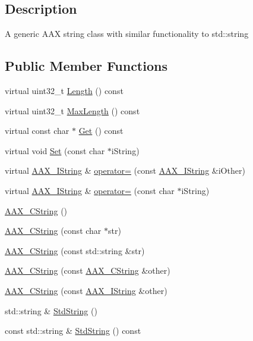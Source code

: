 \subsection{Description}
A generic A\+A\+X string class with similar functionality to {\ttfamily std\+::string} \subsection*{Public Member Functions}
\begin{DoxyCompactItemize}
\item 
virtual uint32\+\_\+t \hyperlink{a00042_a72ac5c3649eda73815efb6deb139cee4}{Length} () const 
\item 
virtual uint32\+\_\+t \hyperlink{a00042_a2d4bc02baad1787f74d8a59d9c68d3a0}{Max\+Length} () const 
\item 
virtual const char $\ast$ \hyperlink{a00042_aa2fd3c16a7bc036d26b66159caa576f3}{Get} () const 
\item 
virtual void \hyperlink{a00042_a0cdc8c41b8badaa9bcde411db95ac84d}{Set} (const char $\ast$i\+String)
\item 
virtual \hyperlink{a00113}{A\+A\+X\+\_\+\+I\+String} \& \hyperlink{a00042_a16f7f37d975e9c6fe7a5d1ef97eb5247}{operator=} (const \hyperlink{a00113}{A\+A\+X\+\_\+\+I\+String} \&i\+Other)
\item 
virtual \hyperlink{a00113}{A\+A\+X\+\_\+\+I\+String} \& \hyperlink{a00042_a2beb6db60d5a5f1109ef84105da7b63d}{operator=} (const char $\ast$i\+String)
\item 
\hyperlink{a00042_aaa78b6da31e2540fefdd31f108262bef}{A\+A\+X\+\_\+\+C\+String} ()
\item 
\hyperlink{a00042_acfcad29d78267fd74592edf79bbe4b5d}{A\+A\+X\+\_\+\+C\+String} (const char $\ast$str)
\item 
\hyperlink{a00042_a048cec8f3bb8c1c1173f134232c01bf9}{A\+A\+X\+\_\+\+C\+String} (const std\+::string \&str)
\item 
\hyperlink{a00042_a5d27338ab3b3175c1e0e7e13bf6dab03}{A\+A\+X\+\_\+\+C\+String} (const \hyperlink{a00042}{A\+A\+X\+\_\+\+C\+String} \&other)
\item 
\hyperlink{a00042_a46d28b14a31fca79480d2f4ce9446939}{A\+A\+X\+\_\+\+C\+String} (const \hyperlink{a00113}{A\+A\+X\+\_\+\+I\+String} \&other)
\item 
std\+::string \& \hyperlink{a00042_a4ce07d506cd4262a5e763c7d30c30740}{Std\+String} ()
\item 
const std\+::string \& \hyperlink{a00042_a56a549e3e136e2f3dbf94a15ee744fde}{Std\+String} () const 

\end{DoxyCompactItemize}
